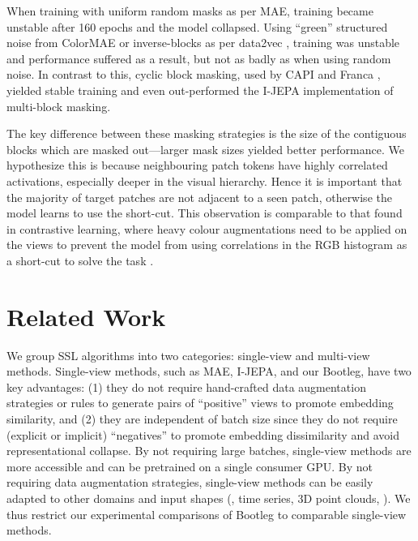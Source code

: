 When training with uniform random masks as per MAE, training became unstable after 160 epochs and the model collapsed.
Using ``green'' structured noise from ColorMAE \citet{hinojosa2024colormae} or inverse-blocks as per data2vec \citet{baevski2023data2vec2}, training was unstable and performance suffered as a result, but not as badly as when using random noise.
In contrast to this, cyclic block masking, used by CAPI and Franca \citep{darcet2025capi, venkataramanan2025franca}, %
yielded stable training and even out-performed the I-JEPA implementation of multi-block masking.

The key difference between these masking strategies is the size of the contiguous blocks which are masked out---larger mask sizes yielded better performance.
We hypothesize this is because neighbouring patch tokens have highly correlated activations, especially deeper in the visual hierarchy.
Hence it is important that the majority of target patches are not adjacent to a seen patch, otherwise the model learns to use the short-cut.
This observation is comparable to that found in contrastive learning, where heavy colour augmentations need to be applied on the views to prevent the model from using correlations in the RGB histogram as a short-cut to solve the task \citep{chen2020simple}.


\section{Related Work}
We group SSL algorithms into two categories: single-view and multi-view methods.
Single-view methods, such as MAE, I-JEPA, and our Bootleg, have two key advantages: (1) they do not require hand-crafted data augmentation strategies or rules to generate pairs of ``positive'' views to promote embedding similarity, and (2) they are independent of batch size since they do not require (explicit or implicit) ``negatives'' to promote embedding dissimilarity and avoid representational collapse.
By not requiring large batches, single-view methods are more accessible and can be pretrained on a single consumer GPU.
By not requiring data augmentation strategies, single-view methods can be easily adapted to other domains and input shapes (\eg{}, time series, 3D point clouds, \etc{}).
We thus restrict our experimental comparisons of Bootleg to comparable single-view methods.

